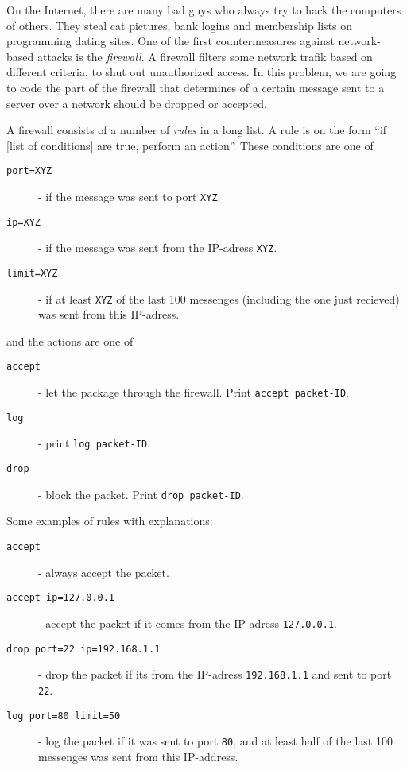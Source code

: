 
On the Internet, there are many bad guys who always try to hack the computers of others. They steal cat pictures, bank logins and membership lists on programming dating sites. One of the first countermeasures against network-based attacks is the \emph{firewall}. A firewall filters some network trafik based on different criteria, to shut out unauthorized access. In this problem, we are going to code the part of the firewall that determines of a certain message sent to a server over a network should be dropped or accepted.

A firewall consists of a number of \emph{rules} in a long list. A rule is on the form ``if [list of conditions] are true, perform an action''. These conditions are one of

\begin{description}
	\item[\texttt{port=XYZ}] - if the message was sent to port \texttt{XYZ}.
	\item[\texttt{ip=XYZ}] - if the message was sent from the IP-adress \texttt{XYZ}.
	\item[\texttt{limit=XYZ}] - if at least \texttt{XYZ} of the last 100 messenges (including the one just recieved) was sent from this IP-adress.
\end{description}

and the actions are one of

\begin{description}
	\item[\texttt{accept}] - let the package through the firewall. Print \texttt{accept packet-ID}.
	\item[\texttt{log}] - print \texttt{log packet-ID}.
	\item[\texttt{drop}] - block the packet. Print \texttt{drop packet-ID}.
\end{description}

Some examples of rules with explanations:
\begin{description}
	\item[\texttt{accept}] - always accept the packet.
	\item[\texttt{accept ip=127.0.0.1}] - accept the packet if it comes from the IP-adress \texttt{127.0.0.1}.
	\item[\texttt{drop port=22 ip=192.168.1.1}] - drop the packet if its from the IP-adress \texttt{192.168.1.1} and sent to port \texttt{22}.
	\item[\texttt{log port=80 limit=50}] - log the packet if it was sent to port \texttt{80}, and at least half of the last 100 messenges was sent from this IP-address.
\end{description}

